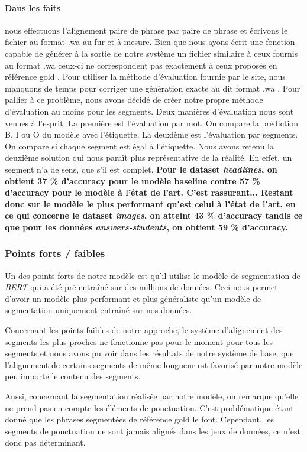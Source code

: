 \documentclass[a4paper, twoside, 11pt]{article}
\begin{document}
 \paragraph{Dans les faits}
 nous effectuons l'alignement paire de phrase par paire de phrase et écrivons le fichier au format \og .wa \fg{} au fur et à mesure. Bien que nous ayons écrit une fonction capable de générer à la sortie de notre système un fichier similaire à ceux fournis au format \og .wa \fg{} ceux-ci ne correspondent pas exactement à ceux proposés en référence \og gold \fg{}. Pour utiliser la méthode d’évaluation fournie par le site, nous manquons de temps pour corriger une génération exacte au dit format \og .wa \fg{}. Pour pallier à ce problème, nous avons décidé de créer notre propre méthode d’évaluation au moins pour les segments. Deux manières d’évaluation nous sont venues à l’esprit. La première est l’évaluation par mot. On compare la prédiction B, I ou O du modèle avec l'étiquette. La deuxième est l’évaluation par segments. On compare si chaque segment est égal à l'étiquette. Nous avons retenu la deuxième solution qui nous paraît plus représentative de la réalité. En effet, un segment n’a de sens, que s’il est complet. \textbf{Pour le dataset \textit{headlines}, on obtient 37 \% d'accuracy pour le modèle baseline contre 57 \% d'accuracy pour le modèle à l'état de l'art. C'est rassurant... Restant donc sur le modèle le plus performant qu'est celui à l'état de l'art, en ce qui concerne le dataset \textit{images}, on atteint 43 \% d'accuracy tandis ce que pour les données \textit{answers-students}, on obtient 59 \% d'accuracy.}


 \subsubsection{Points forts / faibles}
 Un des points forts de notre modèle est qu'il utilise le modèle de segmentation de \textit{BERT} qui a été pré-entraîné sur des millions de données. Ceci nous permet d'avoir un modèle plus performant et plus généraliste qu'un modèle de segmentation uniquement entraîné sur nos données.

Concernant les points faibles de notre approche, le système d'alignement des segments les plus proches ne fonctionne pas pour le moment pour tous les segments et nous avons pu voir dans les résultats de notre système de base, que l'alignement de certains segments de même longueur est favorisé par notre modèle peu importe le contenu des segments.

 Aussi, concernant la segmentation réalisée par notre modèle, on remarque qu'elle ne prend pas en compte les éléments de ponctuation. C'est problématique étant donné que les phrases segmentées de référence \og gold \fg{} le font. Cependant, les segments de ponctuation ne sont jamais alignés dans les jeux de données, ce n'est donc pas déterminant.
\end{document}

